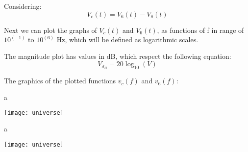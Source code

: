 Considering:
\begin{equation}
	V_c(t) = V_6(t) - V_8(t)
\end{equation} 

Next we can plot the graphs of $V_c(t)$ and $V_6(t)$, as functions of f in range of $10^(-1)$ to $10^(6)$ Hz, which will be defined as logarithmic scales.

The magnitude plot has values in dB, which respect the following equation:
\begin{equation}
	V_d_B = 20\log_10(V)
\end{equation}

The graphics of the plotted functions $v_c(f)$ and $v_6(f)$:

\usepackage{graphicx}
\graphicspath{ {./images/} }

a

\texttt{[image: universe]}


\usepackage{graphicx}
\graphicspath{ {./images/} }

a

\texttt{[image: universe]}
